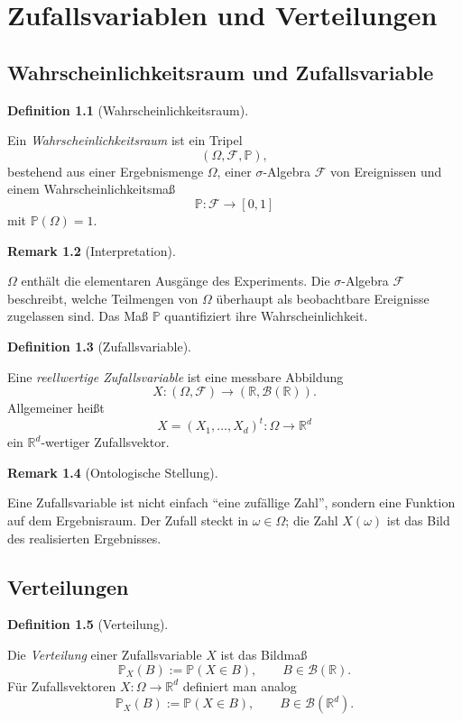 \documentclass[10pt, letterpaper]{article}
\newcommand{\R}{\mathbb{R}}
\newcommand{\CustomHeading}[3]{%
  \par\medskip\noindent%
  \textbf{#1 #2} \textnormal{(#3)}.\enskip%
}
\newenvironment{DEF}[2]{\CustomHeading{Definition}{#1}{#2}}{}
\newenvironment{REM}[2]{\CustomHeading{Remark}{#1}{#2}}{}
\begin{document}
\section{Zufallsvariablen und Verteilungen}

\subsection{Wahrscheinlichkeitsraum und Zufallsvariable}

\begin{DEF}{1.1}{Wahrscheinlichkeitsraum}
Ein \emph{Wahrscheinlichkeitsraum} ist ein Tripel
\[
(\Omega,\mathcal F,\mathbb P),
\]
bestehend aus einer Ergebnismenge \(\Omega\), einer \(\sigma\)-Algebra \(\mathcal F\) von Ereignissen und einem Wahrscheinlichkeitsmaß
\[
\mathbb P:\mathcal F \to [0,1]
\]
mit \(\mathbb P(\Omega)=1\).
\end{DEF}

\begin{REM}{1.2}{Interpretation}
\(\Omega\) enthält die elementaren Ausgänge des Experiments. Die \(\sigma\)-Algebra \(\mathcal F\) beschreibt, welche Teilmengen von \(\Omega\) überhaupt als beobachtbare Ereignisse zugelassen sind. Das Maß \(\mathbb P\) quantifiziert ihre Wahrscheinlichkeit.
\end{REM}

\begin{DEF}{1.3}{Zufallsvariable}
Eine \emph{reellwertige Zufallsvariable} ist eine messbare Abbildung
\[
X:(\Omega,\mathcal F)\to (\R,\mathcal B(\R)).
\]
Allgemeiner heißt
\[
X=(X_1,\dots,X_d)^t:\Omega\to\R^d
\]
ein \(\R^d\)-wertiger Zufallsvektor.
\end{DEF}

\begin{REM}{1.4}{Ontologische Stellung}
Eine Zufallsvariable ist nicht einfach ``eine zufällige Zahl'', sondern eine Funktion auf dem Ergebnisraum. Der Zufall steckt in \(\omega\in\Omega\); die Zahl \(X(\omega)\) ist das Bild des realisierten Ergebnisses.
\end{REM}

\subsection{Verteilungen}

\begin{DEF}{1.5}{Verteilung}
Die \emph{Verteilung} einer Zufallsvariable \(X\) ist das Bildmaß
\[
\mathbb P_X(B):=\mathbb P(X\in B),\qquad B\in\mathcal B(\R).
\]
Für Zufallsvektoren \(X:\Omega\to\R^d\) definiert man analog
\[
\mathbb P_X(B):=\mathbb P(X\in B),\qquad B\in\mathcal B(\R^d).
\]
\end{DEF}
\end{document}
